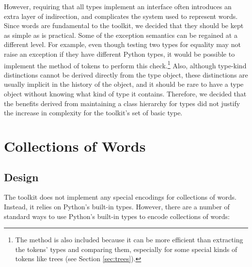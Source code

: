\documentclass[11pt]{article}
\begin{document}
  However, requiring that all types implement an interface often
  introduces an extra layer of indirection, and complicates the system
  used to represent words.  Since words are fundamental to the
  toolkit, we decided that they should be kept as simple as is
  practical.  Some of the exception semantics can be regained at a
  different level.  For example, even though testing two types for
  equality may not raise an exception if they have different Python
  types, it would be possible to implement the 
  method of tokens to perform this check.\footnote{The
   method is also included because it can be more
  efficient than extracting the tokens' types and comparing them,
  especially for some special kinds of tokens like trees (see Section
  \ref{sec:trees}).}  Also, although type-kind distinctions cannot be
  derived directly from the type object, these distinctions are
  usually implicit in the history of the object, and it should be rare
  to have a type object without knowing what kind of type it contains.
  Therefore, we decided that the benefits derived from maintaining a
  class hierarchy for types did not justify the increase in complexity
  for the toolkit's set of basic type.

\section{Collections of Words}
\label{sec:collections}

  \subsection{Design}

  The toolkit does not implement any special encodings for collections
  of words.  Instead, it relies on Python's built-in types.  However,
  there are a number of standard ways to use Python's built-in types
  to encode collections of words:
\end{document}
